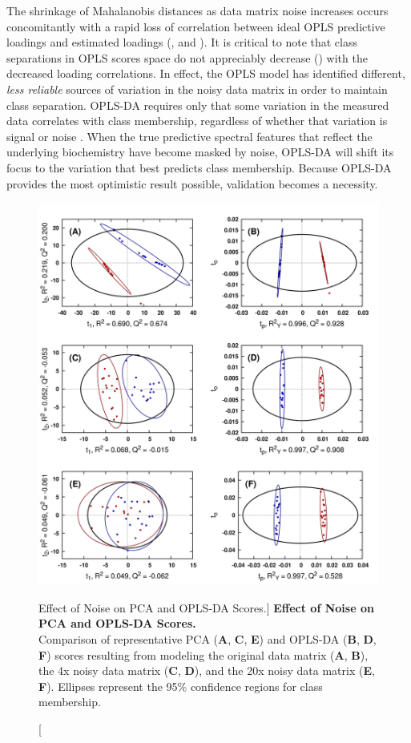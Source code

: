 \begin{doublespace}
The shrinkage of Mahalanobis distances as data matrix noise increases occurs
concomitantly with a rapid loss of correlation between ideal OPLS predictive
loadings and estimated loadings (,
 and ). It is critical to note that
class separations in OPLS scores space do not appreciably decrease
() with the decreased loading correlations.
In effect, the OPLS model has identified different, \emph{less reliable}
sources of variation in the noisy data matrix in order to maintain class
separation. OPLS-DA requires only that some variation in the measured data
correlates with class membership, regardless of whether that variation is
signal or noise \cite{wold:cils2001,trygg:jchemo2002,gottfries:jchemo2008}.
When the true predictive spectral features that reflect the underlying
biochemistry have become masked by noise, OPLS-DA will shift its focus to the
variation that best predicts class membership. Because OPLS-DA provides the
most optimistic result possible, validation becomes a necessity.
\end{doublespace}

\begin{figure}[ht!]
\begin{center}
  \includegraphics[width=5in]{figs/apps/18-scores.png}
\end{center}
\caption
      [Effect of Noise on PCA and OPLS-DA Scores.]{
  {\bf Effect of Noise on PCA and OPLS-DA Scores.}
  \\
  Comparison of representative PCA ({\bf A}, {\bf C}, {\bf E}) and OPLS-DA
  ({\bf B}, {\bf D}, {\bf F}) scores resulting from modeling the original
  data matrix ({\bf A}, {\bf B}), the 4x noisy data matrix ({\bf C}, {\bf D}),
  and the 20x noisy data matrix ({\bf E}, {\bf F}). Ellipses represent
  the 95\% confidence regions for class membership.
}
\label{figure.4.18}
\end{figure}


